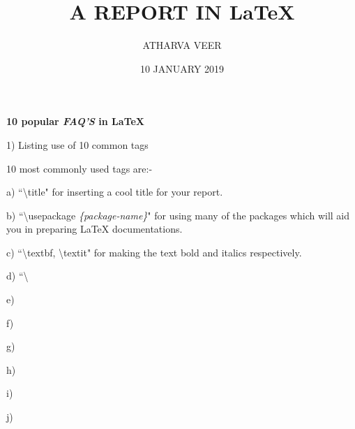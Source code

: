 \documentclass[12pt, letterpaper , twoside]{article}
\title{A REPORT IN \LaTeX{}}
\author{ATHARVA VEER}
\date{10 JANUARY 2019}
\begin{document}
 
\begin{titlepage}
\maketitle
\end{titlepage}
 
\begin{center}
\textbf {10 popular \textit {FAQ'S} in \LaTeX{}} 
\end{center}

\begin{flushleft}

1) Listing use of 10 common tags \par
\setlength{\parindent}{10ex}
10 most commonly used tags are:- \par
\setlength{\parindent}{0ex}
a) ``\textbackslash title" for inserting a cool title for your report. \par
b) ``\textbackslash usepackage \textit {\{package-name\}}" for using many of the packages which will aid you in preparing \LaTeX{} documentations.\par
c) ``\textbackslash textbf, \textbackslash textit" for making the text bold and italics respectively. \par
d) ``\textbackslash \par
e) \par
f) \par
g) \par
h) \par
i) \par
j) \par
\end{flushleft}

 
\end{document}
